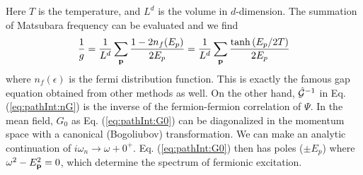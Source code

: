 Here $T$ is the temperature, and $L^{d}$ is the volume in $d$-dimension.  The summation of Matsubara frequency can be evaluated and we find 
\begin{equation}
\frac{1}{g}=\frac{1}{L^d}\sum_{\mathbf{p}}\frac{1-2n_f(E_p)}{2E_p}=\frac{1}{L^d}\sum_{\mathbf{p}}\frac{\tanh{(E_p/2T)}}{2E_p}
\label{eq:pathInt:gap}
\end{equation}
where $n_f(\epsilon)$ is the fermi distribution function.  This is exactly the famous gap equation obtained from other methods as well.  On the other hand, $\hat{\mathcal{G}}^{-1}$ in Eq. (\ref{eq:pathInt:nG})  is the inverse of the  fermion-fermion correlation of $\Psi$.  In the mean field, $G_{0}$ as Eq. (\ref{eq:pathInt:G0}) can be diagonalized in the momentum space with a canonical (Bogoliubov) transformation.  We can make an analytic continuation of $i\omega_{n}\rightarrow\omega+0^{+}$.  Eq. (\ref{eq:pathInt:G0})  then has poles ($\pm{}E_{p}$) where  $\omega^2-E_{\mathbf{p}}^2=0$,  which determine  the spectrum of fermionic excitation.  

